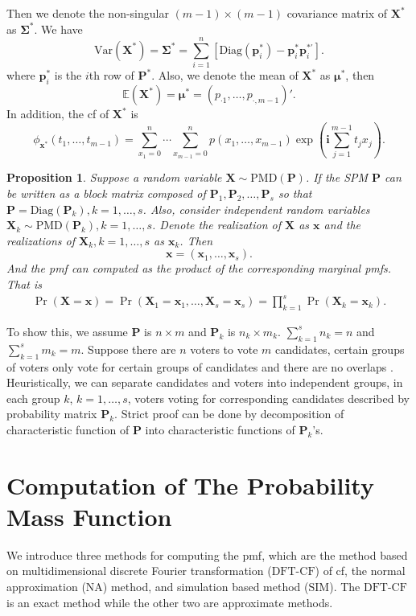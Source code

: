 \documentclass[12pt]{article}
\newcommand{\Sigmavec}{{\boldsymbol{\Sigma}}}
\newcommand{\EE}{\mathbb{E}}
\newcommand{\Pmat}{\mathbf{P}}
\newcommand{\pvec}{\boldsymbol{p}}
\newcommand{\Var}{{\textrm{Var}}}
\newcommand{\ivec}{{\boldsymbol{i}}}
\newcommand{\diag}{\textrm{Diag}}
\newcommand{\PMD}{\textrm{PMD}}
\newcommand{\Xvec}{\boldsymbol{X}}
\newcommand{\xvec}{\boldsymbol{x}}
\newcommand{\muvec}{\boldsymbol{\mu}}
\newcommand{\Sig}{\boldsymbol{\Sigma}}
\newcommand{\SIM}{{\textrm{SIM}}}
\newcommand{\NA}{{\textrm{NA}}}
\newcommand{\dft}{{\textrm{DFT-CF}}}
\newcommand{\qedw}{\hfill \ensuremath{\Box}}
\newtheorem{ppt}{Proposition}
\begin{document}
Then we denote the non-singular $(m-1) \times (m-1)$ covariance matrix of $\Xvec^{\ast}$ as $\Sigmavec^{\ast}$. We have
 $$\Var(\Xvec^{\ast}) =\Sig^{\ast}=\sum_{i=1}^n[\diag(\pvec_i^{\ast})-\pvec_i^{\ast} \pvec_i^{\ast \prime} ].$$
where $\pvec_i^{\ast}$ is the $i$th row of $\Pmat^{\ast}$. Also, we denote the mean of $\Xvec^{\ast}$ as $\muvec^{\ast}$, then
  $$\EE(\Xvec^{\ast}) =\muvec^{\ast} = \left( p_{\cdot1} ,\dots,p_{\cdot,m-1}\right)'.$$
 In addition, the cf of $\Xvec^{\ast}$ is
 \begin{equation*}
\phi_{\xvec^{\ast}}(t_1, \dots, t_{m-1})  =  \sum_{x_1 = 0}^{n} \cdots \sum_{x_{m-1} = 0}^n p(x_1,\ldots,x_{m-1})\exp\left(\ivec\sum_{j=1}^{m-1}t_jx_j\right).
\end{equation*}

\begin{ppt}%
Suppose a random variable $\Xvec \sim \PMD(\Pmat)$. If the SPM $\Pmat$ can be written as a block matrix composed of $\Pmat_1, \Pmat_2, \dots, \Pmat_{s}$ so that $\Pmat = \diag(\Pmat_{k}), k=1,\dots,s$. Also, consider independent random variables $\Xvec_{k} \sim \PMD(\Pmat_{k}), k=1,\dots,s$. Denote the realization of $\Xvec$ as $\xvec$ and the realizations of $\Xvec_{k}, k=1,\dots,s$ as $\xvec_k$. Then
$$\xvec= (\xvec_{1},\dots,\xvec_{s}).$$
And the pmf can computed as the product of the corresponding marginal pmfs. That is
\begin{align*}
\Pr(\Xvec=\xvec)= \Pr(\Xvec_{1}=\xvec_{1}, \dots, \Xvec_{s}=\xvec_{s})= \prod_{k=1}^s \Pr(\Xvec_{k} = \xvec_{k}).
\end{align*}
\end{ppt}

To show this, we assume $\Pmat$ is $n \times m$ and $\Pmat_{k}$ is $n_k \times m_k$. $\sum_{k=1}^s n_k = n$ and $\sum_{k=1}^s m_k = m$. Suppose there are $n$ voters to vote $m$ candidates, certain groups of voters only vote for certain groups of candidates and there are no overlaps . Heuristically, we can separate candidates and voters into independent groups, in each group $k$, $k = 1,\dots,s$, voters voting for corresponding candidates described by probability matrix $\Pmat_{k}$. Strict proof can be done by decomposition of characteristic function of $\Pmat$ into characteristic functions of $\Pmat_{k}$'s.



\section{Computation of The Probability Mass Function} \label{sec:cmpt.pmf}
We introduce three methods for computing the pmf, which are the method based on multidimensional discrete Fourier transformation ($\dft$) of cf, the normal approximation ($\NA$) method, and simulation based method ($\SIM$). The $\dft$ is an exact method while the other two are approximate methods.
\end{document}
